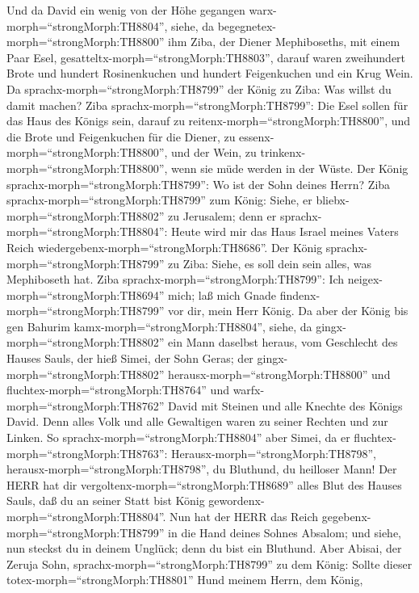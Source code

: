  Und da David ein wenig von der Höhe gegangen
warx-morph=``strongMorph:TH8804'', siehe, da
begegnetex-morph=``strongMorph:TH8800'' ihm Ziba, der Diener
Mephiboseths, mit einem Paar Esel,
gesatteltx-morph=``strongMorph:TH8803'', darauf waren zweihundert Brote
und hundert Rosinenkuchen und hundert Feigenkuchen und ein Krug Wein.
 Da sprachx-morph=``strongMorph:TH8799'' der König zu Ziba:
Was willst du damit machen? Ziba sprachx-morph=``strongMorph:TH8799'':
Die Esel sollen für das Haus des Königs sein, darauf zu
reitenx-morph=``strongMorph:TH8800'', und die Brote und Feigenkuchen für
die Diener, zu essenx-morph=``strongMorph:TH8800'', und der Wein, zu
trinkenx-morph=``strongMorph:TH8800'', wenn sie müde werden in der
Wüste.  Der König sprachx-morph=``strongMorph:TH8799'': Wo
ist der Sohn deines Herrn? Ziba sprachx-morph=``strongMorph:TH8799'' zum
König: Siehe, er bliebx-morph=``strongMorph:TH8802'' zu Jerusalem; denn
er sprachx-morph=``strongMorph:TH8804'': Heute wird mir das Haus Israel
meines Vaters Reich wiedergebenx-morph=``strongMorph:TH8686''.
 Der König sprachx-morph=``strongMorph:TH8799'' zu Ziba:
Siehe, es soll dein sein alles, was Mephiboseth hat. Ziba
sprachx-morph=``strongMorph:TH8799'': Ich
neigex-morph=``strongMorph:TH8694'' mich; laß mich Gnade
findenx-morph=``strongMorph:TH8799'' vor dir, mein Herr König.
 Da aber der König bis gen Bahurim
kamx-morph=``strongMorph:TH8804'', siehe, da
gingx-morph=``strongMorph:TH8802'' ein Mann daselbst heraus, vom
Geschlecht des Hauses Sauls, der hieß Simei, der Sohn Geras; der
gingx-morph=``strongMorph:TH8802'' herausx-morph=``strongMorph:TH8800''
und fluchtex-morph=``strongMorph:TH8764''  und
warfx-morph=``strongMorph:TH8762'' David mit Steinen und alle Knechte
des Königs David. Denn alles Volk und alle Gewaltigen waren zu seiner
Rechten und zur Linken.  So
sprachx-morph=``strongMorph:TH8804'' aber Simei, da er
fluchtex-morph=``strongMorph:TH8763'':
Herausx-morph=``strongMorph:TH8798'',
herausx-morph=``strongMorph:TH8798'', du Bluthund, du heilloser Mann!
 Der HERR hat dir vergoltenx-morph=``strongMorph:TH8689''
alles Blut des Hauses Sauls, daß du an seiner Statt bist König
gewordenx-morph=``strongMorph:TH8804''. Nun hat der HERR das Reich
gegebenx-morph=``strongMorph:TH8799'' in die Hand deines Sohnes Absalom;
und siehe, nun steckst du in deinem Unglück; denn du bist ein Bluthund.
 Aber Abisai, der Zeruja Sohn,
sprachx-morph=``strongMorph:TH8799'' zu dem König: Sollte dieser
totex-morph=``strongMorph:TH8801'' Hund meinem Herrn, dem König,

